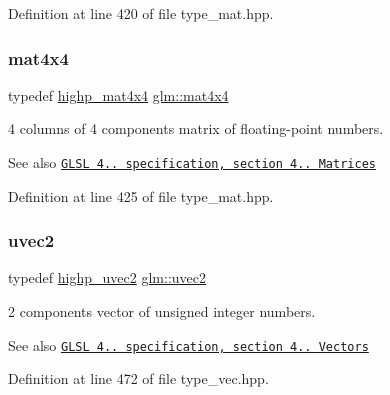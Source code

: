 Definition at line 420 of file type\+\_\+mat.\+hpp.

\mbox{\label{group__core__types_ga63e3ee9447ed593484140a9368e738ec}} 
\subsubsection{\texorpdfstring{mat4x4}{mat4x4}}
{\footnotesize\ttfamily typedef \hyperlink{group__core__precision_ga231950d260be295a25d7340e2020f55c}{highp\+\_\+mat4x4} \hyperlink{group__core__types_ga63e3ee9447ed593484140a9368e738ec}{glm\+::mat4x4}}

4 columns of 4 components matrix of floating-\/point numbers.

\begin{DoxySeeAlso}{See also}
\href{http://www.opengl.org/registry/doc/GLSLangSpec.4.20.8.pdf}{\tt G\+L\+SL 4.. specification, section 4.. Matrices} 
\end{DoxySeeAlso}


Definition at line 425 of file type\+\_\+mat.\+hpp.

\mbox{\label{group__core__types_gafd2041b45eff671aa8899d2c2835eee9}} 
\subsubsection{\texorpdfstring{uvec2}{uvec2}}
{\footnotesize\ttfamily typedef \hyperlink{group__core__precision_gaaf92be4c1fca33cff90c1ed15b521c79}{highp\+\_\+uvec2} \hyperlink{group__core__types_gafd2041b45eff671aa8899d2c2835eee9}{glm\+::uvec2}}

2 components vector of unsigned integer numbers.

\begin{DoxySeeAlso}{See also}
\href{http://www.opengl.org/registry/doc/GLSLangSpec.4.20.8.pdf}{\tt G\+L\+SL 4.. specification, section 4.. Vectors} 
\end{DoxySeeAlso}


Definition at line 472 of file type\+\_\+vec.\+hpp.

\mbox{\label{group__core__types_gac4ba593917841b859ba1683b8b52b8fa}} 
